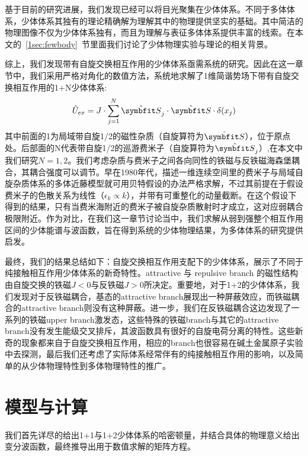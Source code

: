 基于目前的研究进展，我们发现已经可以将目光聚集在少体体系。不同于多体体系，少体体系其独有的理论精确解为理解其中的物理提供坚实的基础。其中简洁的物理图像不仅为少体体系独有，而且为理解与表征多体体系提供丰富的线索。在本文的~\ref{1sec:fewbody}~节里面我们讨论了少体物理实验与理论的相关背景。


综上，我们发现带有自旋交换相互作用的少体体系亟需系统的研究。因此在这一章节中，我们采用严格对角化的数值方法，系统地求解了1维简谐势场下带有自旋交换相互作用的1+N少体体系:
\begin{equation}\label{eq:sp-ex}
    \hat{U}_{ex} = J\cdot\sum_{j=1}^{N}\hat{\Vector{S}}_j\cdot\hat{\Vector{S}}\cdot \delta(x_j)
\end{equation}
其中前面的1为局域带自旋1/2的磁性杂质（自旋算符为$\hat{\Vector{S}}$），位于原点处。后部面的N代表带自旋1/2的巡游费米子（自旋算符为$\hat{\Vector{S}}_j$）,在本文中我们研究$N=1,2$。我们考虑杂质与费米子之间各向同性的铁磁与反铁磁海森堡耦合，其耦合强度可以调节。早在1980年代，描述一维连续空间里的费米子与局域自旋杂质体系的多体近藤模型就可用贝特假设的办法严格求解\cite{andrei1983solution}，不过其前提在于假设费米子的色散关系为线性（$\epsilon_k\propto k$），并带有可重整化的动量截断。在这个假设下得到的结果，只有当费米海附近的费米子被自旋杂质散射时才成立，这对应弱耦合极限附近。作为对比，在我们这一章节讨论当中，我们求解从弱到强整个相互作用区间的少体能谱与波函数，旨在得到系统的少体物理结果，为多体体系的研究提供启发。


最终，我们的结果总结如下：自旋交换相互作用支配下的少体体系，展示了不同于纯接触相互作用少体体系的新奇特性。attractive 与 repulsive branch 的磁性结构由自旋交换的铁磁$J<0$与反铁磁$J>0$所决定。重要地，对于1+2的少体体系，我们发现对于反铁磁耦合，基态的attractive branch展现出一种屏蔽效应，而铁磁耦合的attractive branch则没有这种屏蔽。进一步，我们在反铁磁耦合这边发现了一系列的铁磁upper branch激发态，这些特殊的铁磁branch与其它的attractive branch没有发生能级交叉排斥，其波函数具有很好的自旋电荷分离的特性。这些新奇的现象都来自于自旋交换相互作用，相应的branch也很容易在碱土金属原子实验中去探测，最后我们还考虑了实际体系经常伴有的纯接触相互作用的影响，以及简单的从少体物理特性到多体物理特性的推广。

\section{模型与计算}\label{2sec:spex-model}
我们首先详尽的给出1+1与1+2少体体系的哈密顿量，并结合具体的物理意义给出变分波函数，最终推导出用于数值求解的矩阵方程。
